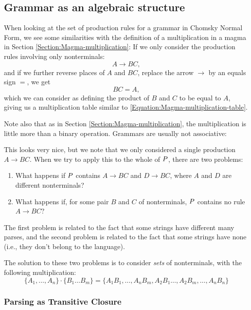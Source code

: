 \subsection{Grammar as an algebraic structure}
When looking at the set of production rules for a grammar in Chomsky Normal Form, we see some similarities with the definition of a multiplication in a magma in Section \ref{Section:Magma-multiplication}:
If we only consider the production rules involving only nonterminals:
\begin{equation*}
  A \to BC,
\end{equation*}
and if we further reverse places of $A$ and $BC$, replace the arrow $\to$ by an equals sign $=$, we get
\begin{equation*}
  BC = A,
\end{equation*}
which we can consider as defining the product of $B$ and $C$ to be equal to $A$, giving us a multiplication table similar to \eqref{Equation:Magma-multiplication-table}.

Note also that as in Section \ref{Section:Magma-multiplication}, the multiplication is little more than a binary operation. Grammars are usually not associative: 

This looks very nice, but we note that we only considered a single production $A \to BC$. When we try to apply this to the whole of $P$, there are two problems:
\begin{enumerate}
\item What happens if $P$ contains $A \to BC$ and $D \to BC$, where $A$ and $D$ are different nonterminals?
\item What happens if, for some pair $B$ and $C$ of nonterminals, $P$ contains no rule $A \to BC$?
\end{enumerate}
The first problem is related to the fact that some strings have different many parses, and the second problem is related to the fact that some strings have none (i.e., they don't belong to the language).

The solution to these two problems is to consider \emph{sets} of nonterminals, with the following multiplication:
\begin{equation*}
  \{A_1, \ldots, A_n \} \cdot \{B_1 \ldots B_m\} = \{A_1B_1, \ldots, A_nB_m, A_2B_1 \ldots, A_2B_m, \ldots, A_nB_n\}
\end{equation*}
\subsubsection{Parsing as Transitive Closure}

